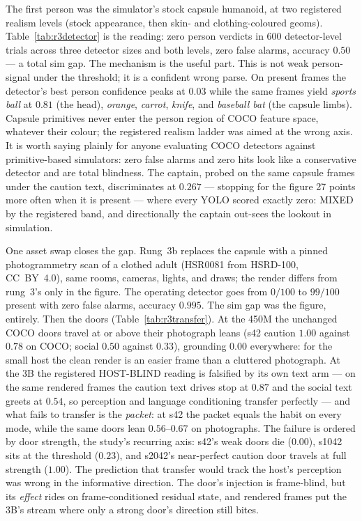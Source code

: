 \documentclass[11pt]{article}
\begin{document}
The first person was the simulator's stock capsule humanoid, at two
registered realism levels (stock appearance, then skin- and
clothing-coloured geoms). Table~\ref{tab:r3detector} is the reading:
zero person verdicts in 600 detector-level trials across three
detector sizes and both levels, zero false alarms, accuracy $0.50$ ---
a total sim gap. The mechanism is the useful part. This is not weak
person-signal under the threshold; it is a confident wrong parse. On
present frames the detector's best person confidence peaks at $0.03$
while the same frames yield \emph{sports ball} at $0.81$ (the head),
\emph{orange}, \emph{carrot}, \emph{knife}, and \emph{baseball bat}
(the capsule limbs). Capsule primitives never enter the person region
of COCO feature space, whatever their colour; the registered realism
ladder was aimed at the wrong axis. It is worth saying plainly for
anyone evaluating COCO detectors against primitive-based simulators:
zero false alarms and zero hits look like a conservative detector and
are total blindness. The captain, probed on the same capsule frames
under the caution text, discriminates at $0.267$ --- stopping for the
figure 27 points more often when it is present --- where every YOLO
scored exactly zero: MIXED by the registered band, and directionally
the captain out-sees the lookout in simulation.

One asset swap closes the gap. Rung~3b replaces the capsule with a
pinned photogrammetry scan of a clothed adult (HSR0081 from HSRD-100,
CC~BY~4.0), same rooms, cameras, lights, and draws; the render differs
from rung~3's only in the figure. The operating detector goes from
$0/100$ to $99/100$ present with zero false alarms, accuracy $0.995$.
The sim gap was the figure, entirely. Then the doors
(Table~\ref{tab:r3transfer}). At the 450M the unchanged COCO doors
travel at or above their photograph leans (s42 caution $1.00$ against
$0.78$ on COCO; social $0.50$ against $0.33$), grounding $0.00$
everywhere: for the small host the clean render is an easier frame than
a cluttered photograph. At the 3B the registered HOST-BLIND reading is
falsified by its own text arm --- on the same rendered frames the
caution text drives stop at $0.87$ and the social text greets at
$0.54$, so perception and language conditioning transfer perfectly ---
and what fails to transfer is the \emph{packet}: at s42 the packet
equals the habit on every mode, while the same doors lean $0.56$--$0.67$
on photographs. The failure is ordered by door strength, the study's
recurring axis: s42's weak doors die ($0.00$), s1042 sits at the
threshold ($0.23$), and s2042's near-perfect caution door travels at
full strength ($1.00$). The prediction that transfer would track the
host's perception was wrong in the informative direction. The door's
injection is frame-blind, but its \emph{effect} rides on
frame-conditioned residual state, and rendered frames put the 3B's
stream where only a strong door's direction still bites.
\end{document}
